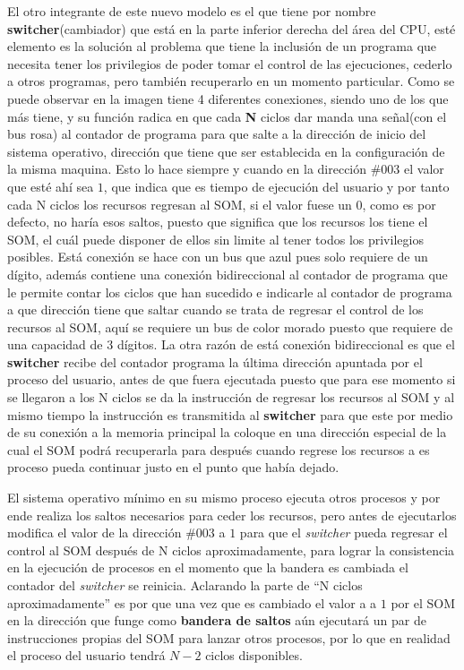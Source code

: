 \documentclass[letterpaper,12pt,oneside]{book}
\begin{document}
		
		El otro integrante de este nuevo modelo es el que tiene por nombre \textbf{switcher}(cambiador) que está en la parte inferior derecha del área del CPU,
		esté elemento es la solución al problema que tiene la inclusión de un programa que necesita tener los privilegios de poder tomar el control de las ejecuciones,
		cederlo a otros programas, pero también recuperarlo en un momento particular. Como se puede observar en la imagen tiene 4 diferentes conexiones, siendo uno
		de los que más tiene, y su función radica en que cada \textbf{N} ciclos dar manda una señal(con el bus rosa) al contador de programa para que salte a la dirección 
		de inicio del sistema operativo, dirección que tiene que ser establecida en la configuración de la misma maquina. Esto lo hace siempre y cuando en la dirección
		\#003 el valor que esté ahí sea $1$, que indica que es tiempo de ejecución del usuario y por tanto cada N ciclos los recursos regresan al SOM, si
		el valor fuese un $0$, como es por defecto, no haría esos saltos, puesto que significa que los recursos los tiene el SOM, el cuál puede disponer
		de ellos sin limite al tener todos los privilegios posibles. Está conexión se hace con un bus que azul pues solo requiere de un dígito, además contiene
		una conexión bidireccional al contador de programa que le permite contar los ciclos que han sucedido e indicarle al contador de programa a que dirección
		tiene que saltar cuando se trata de regresar el control de los recursos al SOM, aquí se requiere un bus de color morado puesto que requiere de una
		capacidad de 3 dígitos. La otra razón de está conexión bidireccional es que el \textbf{switcher} recibe del contador programa la última dirección
		apuntada por el proceso del usuario, antes de que fuera ejecutada puesto que para ese momento si se llegaron a los N ciclos se da la instrucción
		de regresar los recursos al SOM y al mismo tiempo la instrucción es transmitida al \textbf{switcher} para que este por medio de su conexión a la memoria principal
		la coloque en una dirección especial de la cual el SOM podrá recuperarla para después cuando regrese los recursos a es proceso pueda continuar
		justo en el punto que había dejado.
		
		El sistema operativo mínimo en su mismo proceso ejecuta otros procesos y por ende realiza los saltos necesarios para ceder los recursos, pero antes de ejecutarlos		
		modifica el valor de la dirección $\#003$ a $1$ para que el \textit{switcher} pueda regresar el control al SOM después de N ciclos aproximadamente,
		para lograr la consistencia en la ejecución de procesos en el momento que la bandera es cambiada el contador del \textit{switcher} se reinicia. Aclarando
		la parte de ``N ciclos aproximadamente'' es por que
		una vez que es cambiado el valor a a $1$ por el SOM en la dirección que funge como \textbf{bandera de saltos} aún ejecutará un par de instrucciones propias
		del SOM para lanzar otros procesos, por lo que en realidad el proceso del usuario tendrá $N-2$ ciclos disponibles.
		
\end{document}
